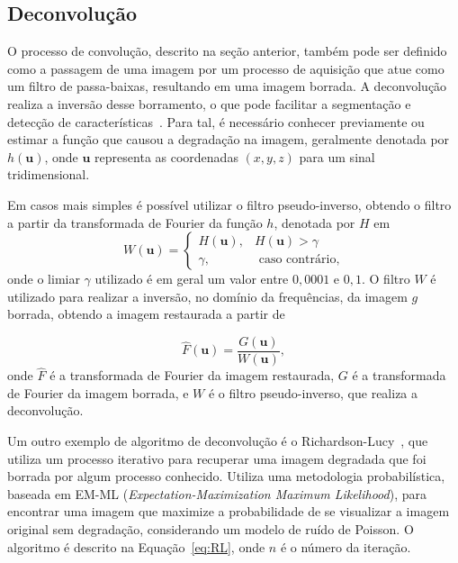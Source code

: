 \subsection{Deconvolução}
\label{sub:deconvolucao}

O processo de convolução, descrito na seção anterior, também pode ser definido como a passagem de uma imagem por um processo de aquisição que atue como um filtro de passa-baixas, resultando em uma imagem borrada. A deconvolução realiza a inversão desse borramento, o que pode facilitar a segmentação e detecção de características~\cite{Ponti2010}. Para tal, é necessário conhecer previamente ou estimar a função que causou a degradação na imagem, geralmente denotada por $h(\mathbf{u})$, onde $\mathbf{u}$ representa as coordenadas $(x,y,z)$ para um sinal tridimensional.

Em casos mais simples é possível utilizar o filtro pseudo-inverso, obtendo o filtro a partir da transformada de Fourier da função $h$, denotada por $H$ em
\begin{equation*}
W(\mathbf{u}) = \left\lbrace
      \begin{array}{ll}
    H(\mathbf{u}),  & H(\mathbf{u}) > \gamma \\
    \gamma,     & \text{ caso contrário},
      \end{array}
\right.
\end{equation*}
\noindent onde o limiar $\gamma$ utilizado é em geral um valor entre $0,0001$ e $0,1$. O filtro $W$ é utilizado para realizar a inversão, no domínio da frequências, da imagem $g$ borrada, obtendo a imagem restaurada a partir de

\begin{equation*}
    \hat{F}(\mathbf{u}) = \frac{G(\mathbf{u})}{W(\mathbf{u})},
\end{equation*}
\noindent onde $\hat{F}$ é a transformada de Fourier da imagem restaurada, $G$ é a transformada de Fourier da imagem borrada, e $W$ é o filtro pseudo-inverso, que realiza a deconvolução.

Um outro exemplo de algoritmo de deconvolução é o Richardson-Lucy~\cite{Ponti-Jr2011}, que utiliza um processo iterativo para recuperar uma imagem degradada que foi borrada por algum processo conhecido. Utiliza uma metodologia probabilística, baseada em EM-ML (\textit{Expectation-Maximization Maximum Likelihood}), para encontrar uma imagem que maximize a probabilidade de se visualizar a imagem original sem degradação, considerando um modelo de ruído de Poisson. O algoritmo é descrito na Equação~\ref{eq:RL}, onde $n$ é o número da iteração.

